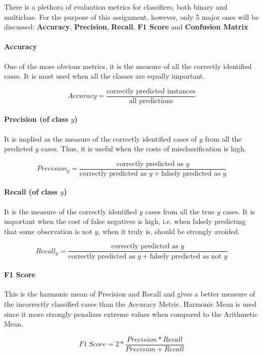 There is a plethora of evaluation metrics for classifiers, both binary and multiclass. For the purpose of this assignment, however, only 5 major ones will be discussed: \textbf{Accuracy}, \textbf{Precision}, \textbf{Recall}, \textbf{F1 Score} and \textbf{Confusion Matrix}

\paragraph{Accuracy} One of the more obvious metrics, it is the measure of all the correctly identified cases. It is most used when all the classes are equally important.

$$
Accuracy = \frac{
    \text{correctly predicted instances}}{
    \text{all predictions}}
$$

\paragraph{Precision (of class $y$)} It is implied as the measure of the correctly identified cases of $y$ from all the predicted $y$ cases. Thus, it is useful when the costs of misclassification is high.

$$
Precision_y = \frac{\text{correctly predicted as } y}{
    \text{correctly predicted as } y + \text{falsely predicted as } y
    }
$$

\paragraph{Recall (of class $y$)} It is the measure of the correctly identified $y$ cases from all the true $y$ cases. It is important when the cost of false negatives is high, i.e. when falsely predicting that some observation is not $y$, when it truly is, should be strongly avoided.

$$
Recall_y = \frac{\text{correctly predicted as } y}{
    \text{correctly predicted as } y + \text{falsely predicted as not } y
    }
$$

\paragraph{F1 Score} This is the harmonic mean of Precision and Recall and gives a better measure of the incorrectly classified cases than the Accuracy Metric.
Harmonic Mean is used since it more strongly penalizes extreme values when compared to the Arithmetic Mean.

$$
F1\ Score = 2 * \frac{Precision * Recall}{Precision + Recall}
$$

